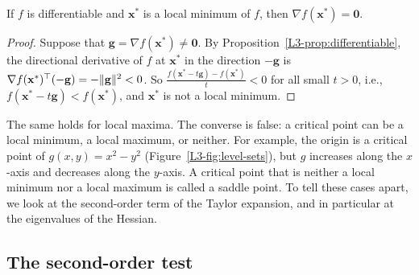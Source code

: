 \begin{theorem}\label{L3-thm:first-order}
    If $f$ is differentiable and $\mathbf{x}^*$ is a local minimum of $f$, then $\nabla f(\mathbf{x}^*) = \mathbf{0}$.
\end{theorem}

\begin{proof}
    Suppose that $\mathbf{g} = \nabla f(\mathbf{x}^*) \neq \mathbf{0}$. By Proposition~\ref{L3-prop:differentiable}, the directional derivative of $f$ at $\mathbf{x}^*$ in the direction $-\mathbf{g}$ is $\nabla f(\mathbf{x}^*)^\top(-\mathbf{g}) = -\lVert \mathbf{g} \rVert^2 < 0$. So $\frac{f(\mathbf{x}^* - t\mathbf{g}) - f(\mathbf{x}^*)}{t} < 0$ for all small $t > 0$, i.e., $f(\mathbf{x}^* - t\mathbf{g}) < f(\mathbf{x}^*)$, and $\mathbf{x}^*$ is not a local minimum.
\end{proof}

The same holds for local maxima. The converse is false: a critical point can be a local minimum, a local maximum, or neither. For example, the origin is a critical point of $g(x, y) = x^2 - y^2$ (Figure~\ref{L3-fig:level-sets}), but $g$ increases along the $x$-axis and decreases along the $y$-axis. A critical point that is neither a local minimum nor a local maximum is called a saddle point. To tell these cases apart, we look at the second-order term of the Taylor expansion, and in particular at the eigenvalues of the Hessian.

\subsection{The second-order test}\label{L3-sec:hessian-eigen}

